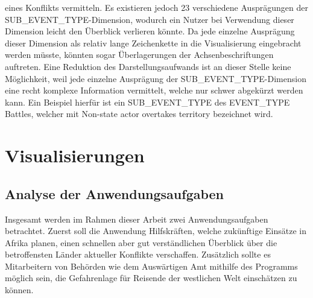 \documentclass[usegeometry=true]{scrartcl}
\begin{document}
eines Konflikts vermitteln. Es existieren jedoch 23 verschiedene Ausprägungen der SUB\_EVENT\_TYPE-Dimension, wodurch ein Nutzer bei Verwendung dieser Dimension leicht den Überblick verlieren könnte. Da jede einzelne Ausprägung dieser Dimension als relativ lange Zeichenkette in die Visualisierung eingebracht werden müsste, könnten sogar Überlagerungen der Achsenbeschriftungen auftreten. Eine Reduktion des Darstellungsaufwands ist an dieser Stelle keine Möglichkeit, weil jede einzelne Ausprägung der SUB\_EVENT\_TYPE-Dimension eine recht komplexe Information vermittelt, welche nur schwer abgekürzt werden kann. Ein Beispiel hierfür ist ein SUB\_EVENT\_TYPE des EVENT\_TYPE \glqq Battles\grqq{}, welcher mit \glqq Non-state actor overtakes territory\grqq{} bezeichnet wird.\\

\section{Visualisierungen}
\subsection{Analyse der Anwendungsaufgaben}

Insgesamt werden im Rahmen dieser Arbeit zwei Anwendungsaufgaben betrachtet. Zuerst soll die Anwendung Hilfskräften, welche zukünftige Einsätze in Afrika planen, einen schnellen aber gut verständlichen Überblick über die betroffensten Länder aktueller Konflikte verschaffen. Zusätzlich sollte es Mitarbeitern von Behörden wie dem Auswärtigen Amt mithilfe des Programms möglich sein, die Gefahrenlage für Reisende der westlichen Welt einschätzen zu können.\\
\end{document}

